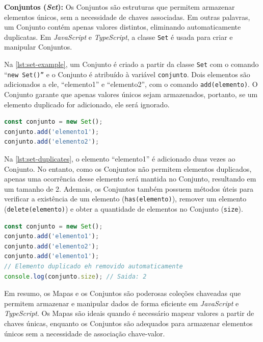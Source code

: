 \textbf{Conjuntos (\textit{Set}):} Os Conjuntos são estruturas que permitem armazenar elementos únicos, sem a necessidade de chaves associadas. Em outras palavras, um Conjunto contém apenas valores distintos, eliminando automaticamente duplicatas. Em \textit{JavaScript} e \textit{TypeScript}, a classe \texttt{Set} é usada para criar e manipular Conjuntos.

Na \autoref{lst:set-example}, um Conjunto é criado a partir da classe \texttt{Set} com o comando ``\texttt{new Set()''} e o Conjunto é atribuído à variável \texttt{conjunto}. Dois elementos são adicionados a ele, ``elemento1'' e ``elemento2'', com o comando \texttt{add(elemento)}. O Conjunto garante que apenas valores únicos sejam armazenados, portanto, se um elemento duplicado for adicionado, ele será ignorado.

\begin{lstlisting}[language=TypeScript, caption=Exemplo de utilização de Conjunto em JS e TS., label=lst:set-example]
const conjunto = new Set();
conjunto.add('elemento1');
conjunto.add('elemento2');
\end{lstlisting}


Na \autoref{lst:set-duplicates}, o elemento ``elemento1'' é adicionado duas vezes ao Conjunto. No entanto, como os Conjuntos não permitem elementos duplicados, apenas uma ocorrência desse elemento será mantida no Conjunto, resultando em um tamanho de 2. Ademais, os Conjuntos também possuem métodos úteis para verificar a existência de um elemento (\texttt{has(elemento)}), remover um elemento (\texttt{delete(elemento)}) e obter a quantidade de elementos no Conjunto (\texttt{size}).
\Needspace{0.3\textheight}

\begin{lstlisting}[language=TypeScript, caption=Removendo elementos duplicados em um Conjunto., label=lst:set-duplicates]
const conjunto = new Set();
conjunto.add('elemento1');
conjunto.add('elemento2');
conjunto.add('elemento1'); 
// Elemento duplicado eh removido automaticamente
console.log(conjunto.size); // Saida: 2
\end{lstlisting}

Em resumo, os Mapas e os Conjuntos são poderosas coleções chaveadas que permitem armazenar e manipular dados de forma eficiente em \textit{JavaScript} e \textit{TypeScript}. Os Mapas são ideais quando é necessário mapear valores a partir de chaves únicas, enquanto os Conjuntos são adequados para armazenar elementos únicos sem a necessidade de associação chave-valor.



